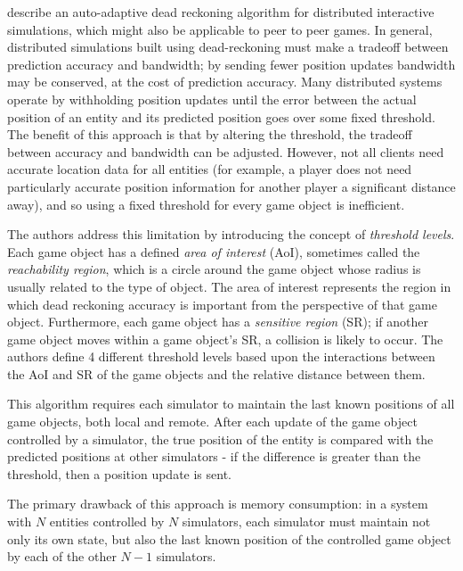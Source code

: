 \documentclass[conference]{IEEEtran}
\begin{document}
	\Textcite{cai1999auto} describe an auto-adaptive dead reckoning algorithm for distributed interactive simulations, which might also be applicable to peer to peer games. In general, distributed simulations built using dead-reckoning must make a tradeoff between prediction accuracy and bandwidth; by sending fewer position updates bandwidth may be conserved, at the cost of prediction accuracy. Many distributed systems operate by withholding position updates until the error between the actual position of an entity and its predicted position goes over some fixed threshold. The benefit of this approach is that by altering the threshold, the tradeoff between accuracy and bandwidth can be adjusted. However, not all clients need accurate location data for all entities (for example, a player does not need particularly accurate position information for another player a significant distance away), and so using a fixed threshold for every game object is inefficient.

	The authors address this limitation by introducing the concept of \emph{threshold levels}. Each game object has a defined \emph{area of interest} (AoI), sometimes called the \emph{reachability region}, which is a circle around the game object whose radius is usually related to the type of object. The area of interest represents the region in which dead reckoning accuracy is important from the perspective of that game object. Furthermore, each game object has a \emph{sensitive region} (SR); if another game object moves within a game object's SR, a collision is likely to occur. The authors define 4 different threshold levels based upon the interactions between the AoI and SR of the game objects and the relative distance between them.

	This algorithm requires each simulator to maintain the last known positions of all game objects, both local and remote. After each update of the game object controlled by a simulator, the true position of the entity is compared with the predicted positions at other simulators - if the difference is greater than the threshold, then a position update is sent.

	The primary drawback of this approach is memory consumption: in a system with $N$ entities controlled by $N$ simulators, each simulator must maintain not only its own state, but also the last known position of the controlled game object by each of the other $N - 1$ simulators.

\end{document}

